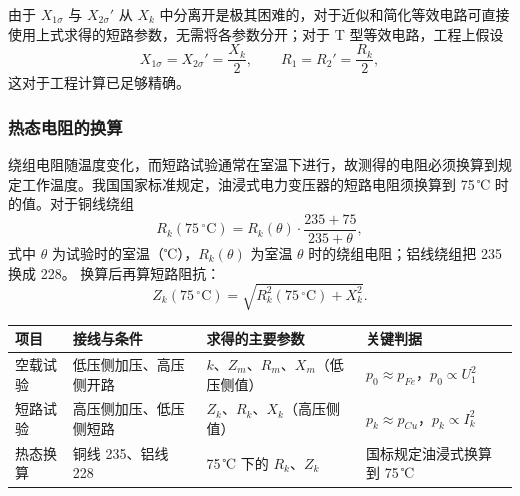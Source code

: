 由于 $X_{1\sigma}$ 与 $X_{2\sigma}'$ 从 $X_k$ 中分离开是极其困难的，对于近似和简化等效电路可直接使用上式求得的短路参数，无需将各参数分开；对于 T 型等效电路，工程上假设
\begin{equation}
X_{1\sigma}=X_{2\sigma}'=\frac{X_k}{2},\qquad
R_1=R_2'=\frac{R_k}{2},
\end{equation}
这对于工程计算已足够精确。

\subsubsection{热态电阻的换算}
绕组电阻随温度变化，而短路试验通常在室温下进行，故测得的电阻必须换算到规定工作温度。我国国家标准规定，油浸式电力变压器的短路电阻须换算到 75\,℃ 时的值。对于铜线绕组
\begin{equation}
R_k(75\,^\circ\mathrm{C})=R_k(\theta)\cdot\frac{235+75}{235+\theta},
\end{equation}
式中 $\theta$ 为试验时的室温（℃），$R_k(\theta)$ 为室温 $\theta$ 时的绕组电阻；铝线绕组把 235 换成 228。
换算后再算短路阻抗：
\begin{equation}
Z_k(75\,^\circ\mathrm{C})=\sqrt{R_k^{2}(75\,^\circ\mathrm{C})+X_k^{2}} .
\end{equation}

\begin{center}
\begin{tabular}{@{}p{1.9cm}p{3.4cm}p{3.9cm}p{4.0cm}@{}}
\toprule
项目 & 接线与条件 & 求得的主要参数 & 关键判据 \\
\midrule
空载试验 & 低压侧加压、高压侧开路 & $k$、$Z_m$、$R_m$、$X_m$（低压侧值） & $p_0\approx p_{Fe}$，$p_0\propto U_1^2$ \\
短路试验 & 高压侧加压、低压侧短路 & $Z_k$、$R_k$、$X_k$（高压侧值） & $p_k\approx p_{Cu}$，$p_k\propto I_k^2$ \\
热态换算 & 铜线 235、铝线 228 & 75\,℃ 下的 $R_k$、$Z_k$ & 国标规定油浸式换算到 75\,℃ \\
\bottomrule
\end{tabular}
\end{center}

